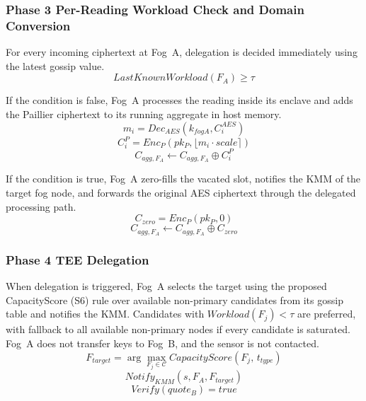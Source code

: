 \documentclass[conference]{IEEEtran}
\begin{document}
    \subsubsection{\textbf{Phase 3 Per-Reading Workload Check and Domain Conversion}}

    For every incoming ciphertext at Fog~A, delegation is decided immediately using the latest gossip value.
    \begin{equation}
    LastKnownWorkload(F_A) \geq \tau
    \end{equation}

    If the condition is false, Fog~A processes the reading inside its enclave and adds the Paillier ciphertext to its running aggregate in host memory.
    \begin{equation}
    m_i = Dec_{AES}(k_{fogA}, C_i^{AES})
    \end{equation}
    \begin{equation}
    C_i^P = Enc_P(pk_P, \lfloor m_i \cdot scale \rceil)
    \end{equation}
    \begin{equation}
    C_{agg,F_A} \leftarrow C_{agg,F_A} \oplus C_i^P
    \end{equation}

    If the condition is true, Fog~A zero-fills the vacated slot, notifies the KMM of the target fog node, and forwards the original AES ciphertext through the delegated processing path.
    \begin{equation}
    C_{zero} = Enc_P(pk_P,0)
    \end{equation}
    \begin{equation}
    C_{agg,F_A} \leftarrow C_{agg,F_A} \oplus C_{zero}
    \end{equation}

    \subsubsection{\textbf{Phase 4 TEE Delegation}}

    When delegation is triggered, Fog~A selects the target using the proposed CapacityScore (S6) rule over available non-primary candidates from its gossip table and notifies the KMM. Candidates with $Workload(F_j)<\tau$ are preferred, with fallback to all available non-primary nodes if every candidate is saturated. Fog~A does not transfer keys to Fog~B, and the sensor is not contacted.
    \begin{equation}
    F_{target}=\arg\max_{F_j\in\mathcal{C}} CapacityScore(F_j,\,t_{type})
    \end{equation}
    \begin{equation}
    Notify_{KMM}(s,F_A,F_{target})
    \end{equation}
    \begin{equation}
    Verify(quote_B)=true
    \end{equation}
\end{document}
